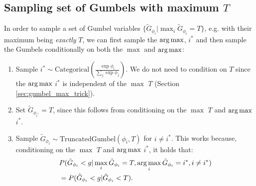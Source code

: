 \subsection{Sampling set of Gumbels with maximum $T$}
In order to sample a set of Gumbel variables $\{\tilde{G}_{\phi_i}|\max_i \tilde{G}_{\phi_i} = T\}$, e.g. with their maximum being \emph{exactly} $T$, we can first sample the $\operatorname*{arg\,max}$, $i^*$ and then sample the Gumbels conditionally on both the $\max$ and $\operatorname*{arg\,max}$:
\begin{enumerate}
    \item Sample $i^* \sim \text{Categorical} \left( \frac{\exp{\phi_i}}{\sum_{j} \exp{\phi_j}} \right)$. We do not need to condition on $T$ since the $\operatorname*{arg\,max}$ $i^*$ is independent of the $\max$ $T$ (Section \ref{sec:gumbel_max_trick}).
    \item Set $\tilde{G}_{\phi_{i^*}} = T$, since this follows from conditioning on the $\max$ $T$ and $\operatorname*{arg\,max}$ $i^*$.
    \item Sample $\tilde{G}_{\phi_i} \sim \text{TruncatedGumbel}(\phi_i, T)$ for $i \neq i^*$. This works because, conditioning on the $\max$ $T$ and $\operatorname*{arg\,max}$ $i^*$, it holds that:
\begin{align*}
    &P(\tilde{G}_{\phi_i} < g | \max_i \tilde{G}_{\phi_i} = T, \operatorname*{arg\,max}_i \tilde{G}_{\phi_i} = i^*, i \neq i^*) \\
    &= P(\tilde{G}_{\phi_i} < g | \tilde{G}_{\phi_i} < T).
\end{align*}
\end{enumerate}

